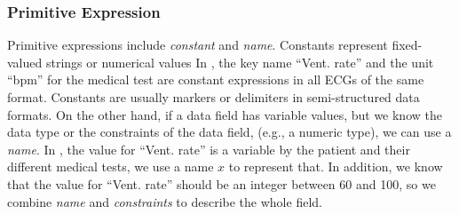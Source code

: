 \subsubsection{Primitive Expression}
Primitive expressions include {\em constant} and {\em name}. 
Constants represent fixed-valued strings or numerical values 
In , the key name ``Vent. rate'' and the unit 
``bpm'' for the medical test are constant expressions in all ECGs of the same
format. Constants are usually markers or delimiters in semi-structured
data formats.
On the other hand, if a data field has variable values,
but we know the data type or the constraints of the data field,
(e.g., a numeric type), we can use a {\em name}. 
In , the value for ``Vent. rate'' is a variable by
the patient and their different medical tests, we use a name $x$ to represent that. 
In addition, we know that the value for ``Vent. rate'' should be an integer 
between 60 and 100, so we combine {\em name} and {\em constraints} 
to describe the whole field. 

